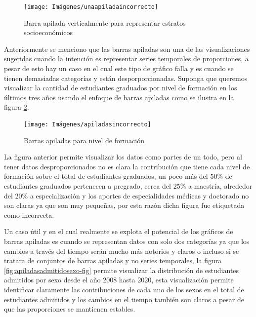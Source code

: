 \documentclass[
]{book}
\begin{document}
\begin{figure}

{\centering \texttt{[image: Imágenes/unaapiladaincorrecto]} 

}

\caption{Barra apilada verticalmente para representar estratos socioeconómicos}\label{fig:apiladaantiestetica-fig}
\end{figure}

Anteriormente se menciono que las barras apiladas son una de las visualizaciones sugeridas cuando la intención es representar series temporales de proporciones, a pesar de esto hay un caso en el cual este tipo de gráfico falla y es cuando se tienen demasiadas categorías y están desporporcionadas. Suponga que queremos visualizar la cantidad de estudiantes graduados por nivel de formación en los últimos tres años usando el enfoque de barras apiladas como se ilustra en la figura \ref{fig:apiladasincorrecto-fig}.

\begin{figure}

{\centering \texttt{[image: Imágenes/apiladasincorrecto]} 

}

\caption{Barras apiladas para nivel de formación}\label{fig:apiladasincorrecto-fig}
\end{figure}

La figura anterior permite visualizar los datos como partes de un todo, pero al tener datos desproporcionados no es clara la contribución que tiene cada nivel de formación sobre el total de estudiantes graduados, un poco más del \(50\%\) de estudiantes graduados pertenecen a pregrado, cerca del \(25\%\) a maestría, alrededor del \(20\%\) a especialización y los aportes de especialidades médicas y doctorado no son claras ya que son muy pequeñas, por esta razón dicha figura fue etiquetada como incorrecta.

Un caso útil y en el cual realmente se explota el potencial de los gráficos de barras apiladas es cuando se representan datos con solo dos categorías ya que los cambios a través del tiempo serán mucho más notorios y claros o incluso si se tratara de conjuntos de barras apiladas y no series temporales, la figura \ref{fig:apiladasadmitidosexo-fig} permite visualizar la distribución de estudiantes admitidos por sexo desde el año 2008 hasta 2020, esta visualización permite identificar claramente las contribuciones de cada uno de los sexos en el total de estudiantes admitidos y los cambios en el tiempo también son claros a pesar de que las proporciones se mantienen estables.
\end{document}
